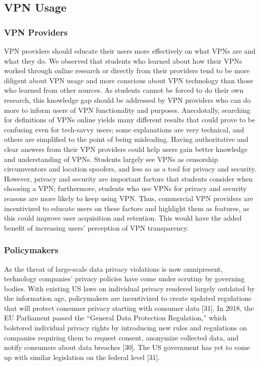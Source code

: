 \subsection{VPN Usage}
\subsubsection{VPN Providers}

VPN providers should educate their users more effectively on what VPNs are and what they do. We observed that students who learned about how their VPNs worked through online research or directly from their providers tend to be more diligent about VPN usage and more conscious about VPN technology than those who learned from other sources. As students cannot be forced to do their own research, this knowledge gap should be addressed by VPN providers who can do more to inform users of VPN functionality and purposes. Anecdotally, searching for definitions of VPNs online yields many different results that could prove to be confusing even for tech-savvy users; some explanations are very technical, and others are simplified to the point of being misleading. Having authoritative and clear answers from their VPN providers could help users gain better knowledge and understanding of VPNs. Students largely see VPNs as censorship circumventors and location spoofers, and less so as a tool for privacy and security. However, privacy and security are important factors that students consider when choosing a VPN; furthermore, students who use VPNs for privacy and security reasons are more likely to keep using VPN. Thus, commercial VPN providers are incentivized to educate users on these factors and highlight them as features, as this could improve user acquisition and retention. This would have the added benefit of increasing users’ perception of VPN transparency.

\subsubsection{Policymakers}

As the threat of large-scale data privacy violations is now omnipresent, technology companies’ privacy policies have come under scrutiny by governing bodies. With existing US laws on individual privacy rendered largely outdated by the information age, policymakers are incentivized to create updated regulations that will protect consumer privacy starting with consumer data [31]. In 2018, the EU Parliament passed the “General Data Protection Regulation,” which bolstered individual privacy rights by introducing new rules and regulations on companies requiring them to request consent, anonymize collected data, and notify consumers about data breaches [30]. The US government has yet to come up with similar legislation on the federal level [31].

